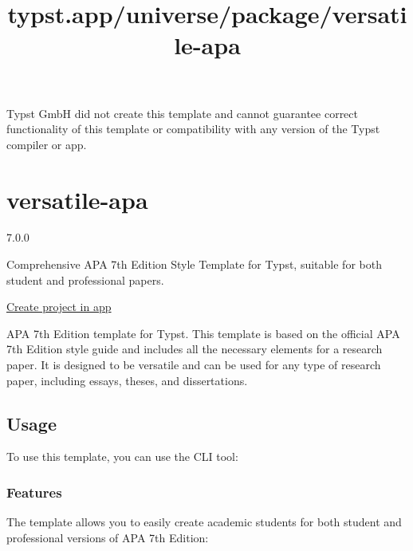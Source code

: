 Typst GmbH did not create this template and cannot guarantee correct
functionality of this template or compatibility with any version of the
Typst compiler or app.


\title{typst.app/universe/package/versatile-apa}

\label{banner}
\label{template-thumbnail}

\section{versatile-apa}\label{versatile-apa}

{ 7.0.0 }

Comprehensive APA 7th Edition Style Template for Typst, suitable for
both student and professional papers.

\href{/app?template=versatile-apa&version=7.0.0}{Create project in app}

\label{readme}
APA 7th Edition template for Typst. This template is based on the
official APA 7th Edition style guide and includes all the necessary
elements for a research paper. It is designed to be versatile and can be
used for any type of research paper, including essays, theses, and
dissertations.

\subsection{Usage}\label{usage}

To use this template, you can use the CLI tool:

\begin{Shaded}
\begin{Highlighting}[]
\end{Highlighting}
\end{Shaded}

\subsubsection{Features}\label{features}

The template allows you to easily create academic students for both
student and professional versions of APA 7th Edition:

